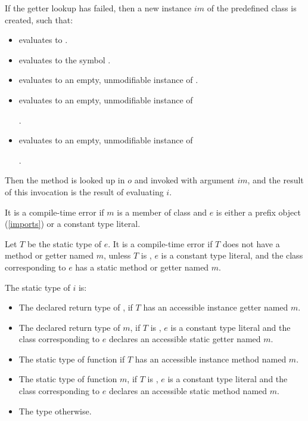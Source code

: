 \documentclass[makeidx]{article}
\begin{document}
\LMHash{}%
If the getter lookup has failed, then a new instance $im$ of the predefined class  is created, such that:
\begin{itemize}
\item {} evaluates to \code{\TRUE{}}.
\item {} evaluates to the symbol .
\item {} evaluates to an empty, unmodifiable instance of
.
\item {} evaluates to an empty, unmodifiable instance of

.
\item {} evaluates to an empty, unmodifiable instance of

.
\end{itemize}

\LMHash{}%
Then the method  is looked up in $o$ and invoked with argument $im$,
and the result of this invocation is the result of evaluating $i$.


\LMHash{}%
It is a compile-time error if $m$ is a member of class  and $e$ is either a prefix object (\ref{imports}) or a constant type literal.


\LMHash{}%
Let $T$ be the static type of $e$.
It is a compile-time error if $T$ does not have a method or getter named $m$,
unless $T$ is ,
$e$ is a constant type literal,
and the class corresponding to $e$ has a static method or getter named $m$.

\LMHash{}%
The static type of $i$ is:
\begin{itemize}
\item The declared return type of , if $T$ has an accessible instance getter named $m$.
\item
The declared return type of $m$, if $T$ is ,
$e$ is a constant type literal
and the class corresponding to $e$ declares an accessible static getter named $m$.
\item The static type of function  if $T$ has an accessible instance method named $m$.
\item
The static type of function $m$, if $T$ is ,
$e$ is a constant type literal
and the class corresponding to $e$ declares an accessible static method named $m$.
\item The type \DYNAMIC{} otherwise.
\end{itemize}
\end{document}
